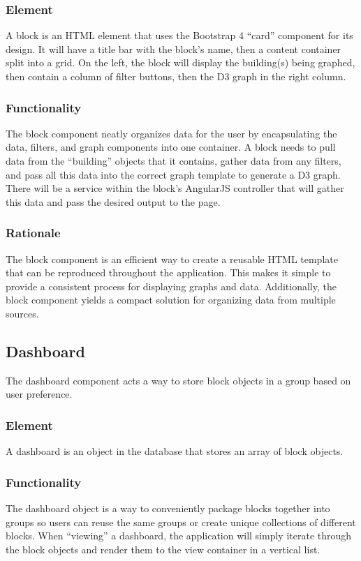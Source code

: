 \documentclass[journal,10pt,onecolumn,compsoc]{IEEEtran}
\begin{document}
    \subsubsection{Element} 
    A block is an HTML element that uses the Bootstrap 4 ``card'' component for its design. It will have a title bar with the block's name, then a content container split into a grid. On the left, the block will display the building(s) being graphed, then contain a column of filter buttons, then the D3 graph in the right column. 
    \subsubsection{Functionality}
    The block component neatly organizes data for the user by encapsulating the data, filters, and graph components into one container. A block needs to pull data from the ``building'' objects that it contains, gather data from any filters, and pass all this data into the correct graph template to generate a D3 graph. There will be a service within the block's AngularJS controller that will gather this data and pass the desired output to the page.
    \subsubsection{Rationale} 
    The block component is an efficient way to create a reusable HTML template that can be reproduced throughout the application. This makes it simple to provide a consistent process for displaying graphs and data. Additionally, the block component yields a compact solution for organizing data from multiple sources. 
    \subsection{Dashboard}
    The dashboard component acts a way to store block objects in a group based on user preference.
    \subsubsection{Element} 
    A dashboard is an object in the database that stores an array of block objects.
    \subsubsection{Functionality}
    The dashboard object is a way to conveniently package blocks together into groups so users can reuse the same groups or create unique collections of different blocks. When ``viewing'' a dashboard, the application will simply iterate through the block objects and render them to the view container in a vertical list.
\end{document}
